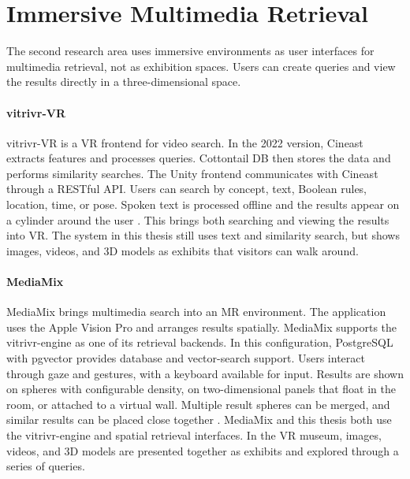 \section{Immersive Multimedia Retrieval}
\label{sec:related-immersive-retrieval}

The second research area uses immersive environments as user interfaces for multimedia retrieval, not as exhibition spaces. Users can create queries and view the results directly in a three-dimensional space.

\paragraph{vitrivr-VR}
vitrivr-VR is a VR frontend for video search. In the 2022 version, Cineast extracts features and processes queries. Cottontail DB then stores the data and performs similarity searches. The Unity frontend communicates with Cineast through a RESTful API. Users can search by concept, text, Boolean rules, location, time, or pose. Spoken text is processed offline and the results appear on a cylinder around the user \citep{spiess2022vitrivrvr}. This brings both searching and viewing the results into VR. The system in this thesis still uses text and similarity search, but shows images, videos, and 3D models as exhibits that visitors can walk around.

\paragraph{MediaMix}
MediaMix brings multimedia search into an MR environment. The application uses the Apple Vision Pro and arranges results spatially. MediaMix supports the vitrivr-engine as one of its retrieval backends. In this configuration, PostgreSQL with pgvector provides database and vector-search support. Users interact through gaze and gestures, with a keyboard available for input. Results are shown on spheres with configurable density, on two-dimensional panels that float in the room, or attached to a virtual wall. Multiple result spheres can be merged, and similar results can be placed close together \citep{arnold2026mediamix}. MediaMix and this thesis both use the vitrivr-engine and spatial retrieval interfaces. In the VR museum, images, videos, and 3D models are presented together as exhibits and explored through a series of queries.

